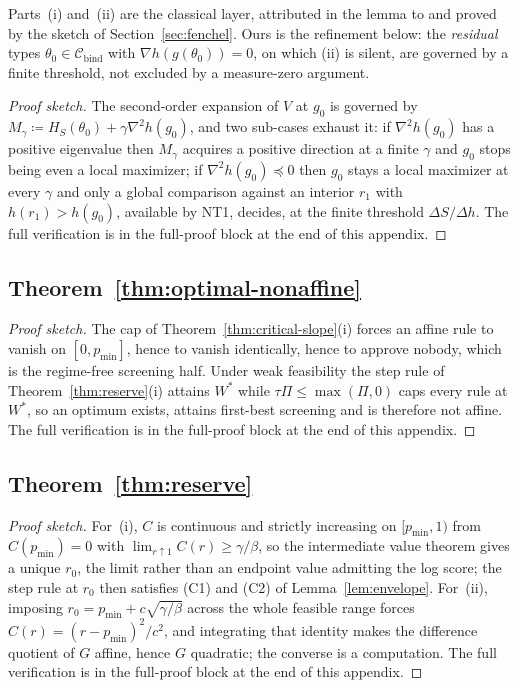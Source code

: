 \documentclass[acmsmall,nonacm,screen]{acmart}
\theoremstyle{acmplain}%
\theoremstyle{acmdefinition}%
\newcommand{\Cbind}{\mathcal{C}_{\mathrm{bind}}}
\numberwithin{equation}{section}
\newcommand{\suppsec}[1]{the full-proof block at the end of this appendix}
\begin{document}
\begin{appendix}
Parts~(i) and~(ii) are the classical layer, attributed in the lemma to \citet{boutilier2012eliciting} and proved by the sketch of Section~\ref{sec:fenchel}. Ours is the refinement below: the \emph{residual} types $\theta_0\in\Cbind$ with $\nabla h(g(\theta_0))=0$, on which (ii) is silent, are governed by a finite threshold, not excluded by a measure-zero argument.

\begin{proof}[Proof sketch]
The second-order expansion of $V$ at $g_0$ is governed by $M_\gamma\coloneqq H_S(\theta_0)+\gamma\nabla^2h(g_0)$, and two sub-cases exhaust it: if $\nabla^2h(g_0)$ has a positive eigenvalue then $M_\gamma$ acquires a positive direction at a finite $\gamma$ and $g_0$ stops being even a local maximizer; if $\nabla^2h(g_0)\preceq0$ then $g_0$ stays a local maximizer at every $\gamma$ and only a global comparison against an interior $r_1$ with $h(r_1)>h(g_0)$, available by NT1, decides, at the finite threshold $\Delta S/\Delta h$. The full verification is in \suppsec{S.3}.
\end{proof}


\subsection{Theorem~\ref{thm:optimal-nonaffine}}\label{app:optimal-oversight}

\begin{proof}[Proof sketch]
The cap of Theorem~\ref{thm:critical-slope}(i) forces an affine rule to vanish on $[0,p_{\min}]$, hence to vanish identically, hence to approve nobody, which is the regime-free screening half. Under weak feasibility the step rule of Theorem~\ref{thm:reserve}(i) attains $W^*$ while $\tau\Pi\leq\max(\Pi,0)$ caps every rule at $W^*$, so an optimum exists, attains first-best screening and is therefore not affine. The full verification is in \suppsec{S.4}.
\end{proof}


\subsection{Theorem~\ref{thm:reserve}}\label{app:reserve}

\begin{proof}[Proof sketch]
For~(i), $C$ is continuous and strictly increasing on $[p_{\min},1)$ from $C(p_{\min})=0$ with $\lim_{r\uparrow1}C(r)\geq\gamma/\beta$, so the intermediate value theorem gives a unique $r_0$, the limit rather than an endpoint value admitting the log score; the step rule at $r_0$ then satisfies (C1) and (C2) of Lemma~\ref{lem:envelope}. For~(ii), imposing $r_0=p_{\min}+c\sqrt{\gamma/\beta}$ across the whole feasible range forces $C(r)=(r-p_{\min})^2/c^2$, and integrating that identity makes the difference quotient of $G$ affine, hence $G$ quadratic; the converse is a computation. The full verification is in \suppsec{S.5}.
\end{proof}



\end{appendix}
\end{document}
